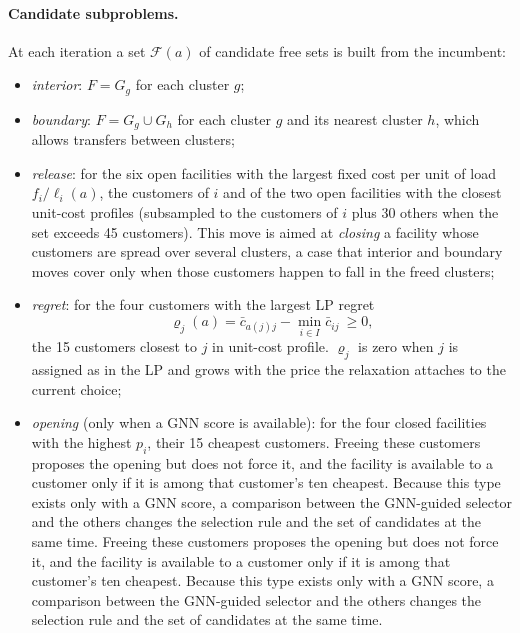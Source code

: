 \paragraph{Candidate subproblems.} At each iteration a set $\mathcal{F}(a)$ of candidate free
sets is built from the incumbent:
\begin{itemize}
\item \emph{interior}: $F=G_g$ for each cluster $g$;
\item \emph{boundary}: $F=G_g\cup G_h$ for each cluster $g$ and its nearest cluster $h$, which
allows transfers between clusters;
\item \emph{release}: for the six open facilities with the largest fixed cost per unit of load
$f_i/\ell_i(a)$, the customers of $i$ and of the two open facilities with the closest unit-cost
profiles (subsampled to the customers of $i$ plus 30 others when the set exceeds 45
customers). This move is aimed at \emph{closing} a facility whose customers are spread over
several clusters, a case that interior and boundary moves cover only when those customers happen
to fall in the freed clusters;
\item \emph{regret}: for the four customers with the largest LP regret
\begin{equation}\label{eq:regret}
\varrho_j(a)=\bar c_{a(j)j}-\min_{i\in I}\bar c_{ij}\ \ge 0,
\end{equation}
the 15 customers closest to $j$ in unit-cost profile. $\varrho_j$ is zero when $j$ is assigned as
in the LP and grows with the price the relaxation attaches to the current choice;
\item \emph{opening} (only when a GNN score is available): for the four closed facilities with the
highest $p_i$, their 15 cheapest customers. Freeing these customers proposes the opening but does
not force it, and the facility is available to a customer only if it is among that customer's ten
cheapest. Because this type exists only with a GNN score, a comparison between the GNN-guided
selector and the others changes the selection rule and the set of candidates at the same time. Freeing these customers proposes the opening but does
not force it, and the facility is available to a customer only if it is among that customer's ten
cheapest. Because this type exists only with a GNN score, a comparison between the GNN-guided
selector and the others changes the selection rule and the set of candidates at the same time.
\end{itemize}

